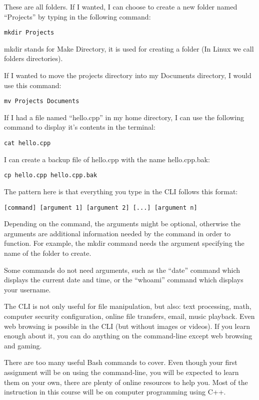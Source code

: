 \documentclass[a4paper,12pt]{article}
\begin{document}
These are all folders. If I wanted, I can choose to create a new folder named ``Projects'' by typing in the following command:
\begin{lstlisting}
mkdir Projects
\end{lstlisting}
mkdir stands for Make Directory, it is used for creating a folder (In Linux we call folders directories).

If I wanted to move the projects directory into my Documents directory, I would use this command:
\begin{lstlisting}
mv Projects Documents
\end{lstlisting}

If I had a file named ``hello.cpp'' in my home directory, I can use the following command to display it's contents in the terminal:
\begin{lstlisting}
cat hello.cpp
\end{lstlisting}

I can create a backup file of hello.cpp with the name hello.cpp.bak:
\begin{lstlisting}
cp hello.cpp hello.cpp.bak
\end{lstlisting}

The pattern here is that everything you type in the CLI follows this format:
\begin{lstlisting}
[command] [argument 1] [argument 2] [...] [argument n]
\end{lstlisting}

Depending on the command, the arguments might be optional, otherwise the arguments are additional information needed by the command in order to function. For example, the mkdir command needs the argument specifying the name of the folder to create.

Some commands do not need arguments, such as the ``date'' command which displays the current date and time, or the ``whoami'' command which displays your username.

The CLI is not only useful for file manipulation, but also: text processing, math, computer security configuration, online file transfers, email, music playback. Even web browsing is possible in the CLI (but without images or videos). If you learn enough about it, you can do anything on the command-line except web browsing and gaming.

There are too many useful Bash commands to cover. Even though your first assignment will be on using the command-line, you will be expected to learn them on your own, there are plenty of online resources to help you. Most of the instruction in this course will be on computer programming using C++.
\end{document}
